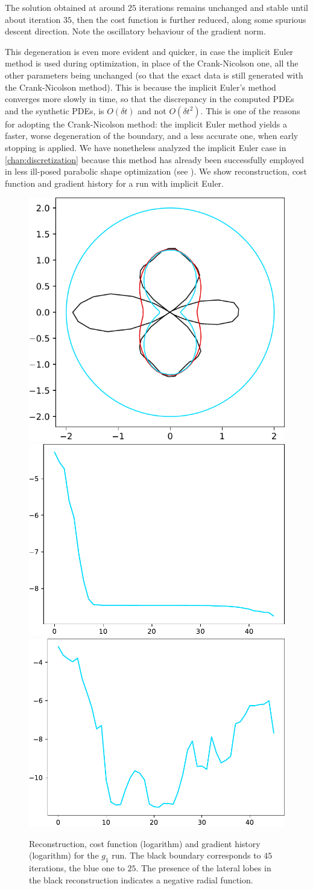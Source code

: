 \documentclass[english,a4paper,10pt,oneside]{scrbook}	%
\theoremstyle{break}
\theoremstyle{remark}
\begin{document}
The solution obtained at around $25$ iterations remains unchanged and stable until about iteration $35$, then the cost function is further reduced, along some spurious descent direction. Note the oscillatory behaviour of the gradient norm.

This degeneration is even more evident and quicker, in case the implicit Euler method is used during optimization, in place of the Crank-Nicolson one, all the other parameters being unchanged (so that the exact data is still generated with the Crank-Nicolson method). This is because the implicit Euler's method converges more slowly in time, so that the discrepancy in the computed PDEs and the synthetic PDEs, is $O(\delta t)$ and not $O(\delta t^2)$. This is one of the reasons for adopting the Crank-Nicolson method: the implicit Euler method yields a faster, worse degeneration of the boundary, and a less accurate one, when early stopping is applied. We have nonetheless analyzed the implicit Euler case in \cref{chap:discretization} because this method has already been successfully employed in less ill-posed parabolic shape optimization (see \cite{lindemann2}). We show reconstruction, cost function and gradient history for a run with implicit Euler.

\begin{figure}[H]
\centering
\includegraphics[height=0.25\columnwidth]{Images/comparison_25_45_euler.pdf}
\includegraphics[height=0.25\columnwidth]{Images/hourglass_constant_euler/cost_function_45.pdf}
\includegraphics[height=0.25\columnwidth]{Images/hourglass_constant_euler/gradient_infty_norm_45.pdf}
\caption{Reconstruction, cost function (logarithm) and gradient history (logarithm) for the $g_1$ run. The black boundary corresponds to $45$ iterations, the blue one to $25$. The presence of the lateral lobes in the black reconstruction indicates a negative radial function.}\label{fig:degenerate_euler}
\end{figure}
\end{document}
